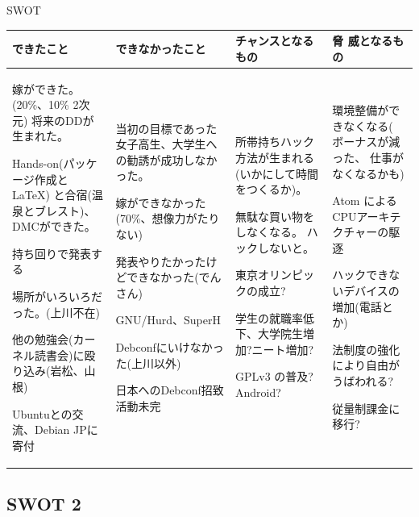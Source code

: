 \begin{frame}{SWOT}

{\tiny
\begin{tabular}[t]{|p{8em}|p{8em}|p{8em}|p{8em}|}
\hline
できたこと & できなかったこと & チャンスとなるもの & 脅
 威となるもの \\
\hline
嫁ができた。(20\%、10\% 2次元)
将来のDDが生まれた。

Hands-on(パッケージ作成と\LaTeX{}) と合宿(温泉とブレスト)、
DMCができた。

持ち回りで発表する

場所がいろいろだった。(上川不在)

他の勉強会(カーネル読書会)に殴り込み(岩松、山根)

Ubuntuとの交流、Debian JPに寄付



&

当初の目標であった女子高生、大学生への勧誘が成功しなかった。

嫁ができなかった(70\%、想像力がたりない)

発表やりたかったけどできなかった(でんさん)

GNU/Hurd、SuperH

Debconfにいけなかった(上川以外)

日本へのDebconf招致活動未完

&
	 
所帯持ちハック方法が生まれる(いかにして時間をつくるか)。

無駄な買い物をしなくなる。
ハックしないと。

東京オリンピックの成立?

学生の就職率低下、大学院生増加?ニート増加?

GPLv3 の普及?
Android?

&

環境整備ができなくなる(
ボーナスが減った、
仕事がなくなるかも)

Atom によるCPUアーキテクチャーの駆逐

ハックできないデバイスの増加(電話とか)

法制度の強化により自由がうばわれる?

従量制課金に移行?

\\
\hline
\end{tabular}
}
\end{frame}
\subsection{SWOT 2}

